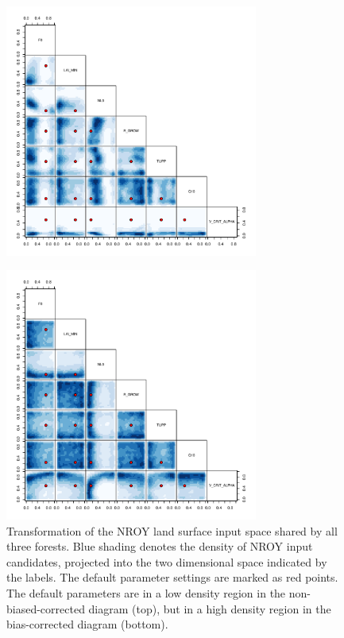 \documentclass[gmd, manuscript]{copernicus}
\begin{document}
\begin{figure}[t]
\includegraphics[width=8.3cm]{../graphics/best_inputs_all_nobc.pdf}
\caption{
}
\label{fig:best_inputs_all_nobc}
\end{figure}


\begin{figure}[t]
\includegraphics[width=8.3cm]{../graphics/best_inputs_all_bc.pdf}
\caption{Transformation of the NROY land surface input space shared by all three forests. Blue shading denotes the density of NROY input candidates, projected into the two dimensional space indicated by the labels. The default parameter settings are marked as red points. The default parameters are in a low density region in the non-biased-corrected diagram (top), but in a high density region in the bias-corrected diagram (bottom).
}
\label{fig:best_inputs_all_bc}
\end{figure}
\end{document}
